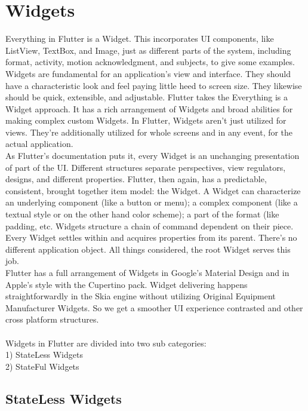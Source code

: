 \chapter{Widgets}

Everything in Flutter is a Widget. This incorporates UI components, like ListView,
TextBox, and Image, just as different parts of the system, including format, activity, motion
acknowledgment, and subjects, to give some examples.\\
Widgets are fundamental for an application's view and interface. They should have a characteristic look and
feel paying little heed to screen size. They likewise should be quick, extensible, and adjustable. Flutter takes the
Everything is a Widget approach. It has a rich arrangement of Widgets and broad abilities for making
complex custom Widgets. In Flutter, Widgets aren't just utilized for views. They're additionally utilized for whole
screens and in any event, for the actual application.\\
As Flutter's documentation puts it, every Widget is an unchanging presentation of part of the
UI. Different structures separate perspectives, view regulators, designs, and different properties.
Flutter, then again, has a predictable, consistent, brought together item model: the Widget.
A Widget can characterize an underlying component (like a button or menu); a complex component (like a textual style
or on the other hand color scheme); a part of the format (like padding, etc.
Widgets structure a chain of command dependent on their piece. Every Widget settles within and acquires
properties from its parent. There's no different application object. All things considered, the root Widget serves this
job.\\
Flutter has a full arrangement of Widgets in Google's Material Design and in Apple's style with the
Cupertino pack. Widget delivering happens straightforwardly in the Skia engine without utilizing Original
Equipment Manufacturer Widgets. So we get a smoother UI experience contrasted and other cross
platform structures.\\
\\
Widgets in Flutter are divided into two sub categories:\\
1) StateLess Widgets\\
2) StateFul Widgets\\

\section{StateLess Widgets}

